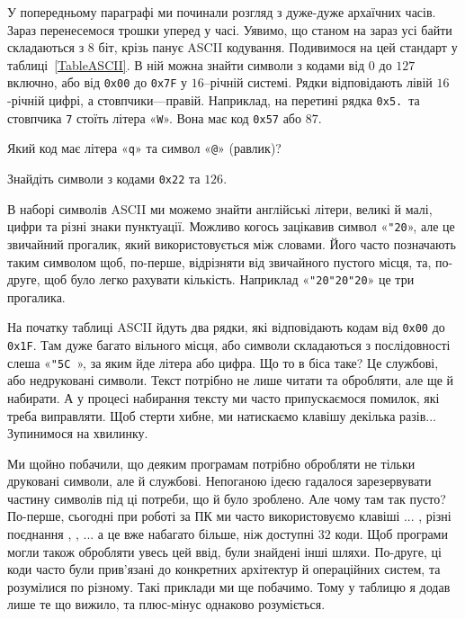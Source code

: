 \documentclass{book}
\newcommand{\hexstr}[1]{{\tt 0x#1}}
\newcommand{\escape}[1]{\texttt{\char"5C #1}}
\newcommand{\chr}[1]{«\texttt{#1}»}
\newcommand{\s}{\char"20}
\newcommand{\chspace}{\chr\s}
\newcommand{\chesc}[1]{\chr{\escape{#1}}}
\begin{document}
У попередньому параграфі ми починали розгляд з дуже-дуже архаїчних часів.
Зараз перенесемося трошки уперед у часі.
Уявимо, що станом на зараз усі байти складаються з $8$ біт, крізь панує ASCII кодування.
Подивимося на цей стандарт у таблиці~\ref{TableASCII}.
В ній можна знайти символи з кодами від $0$ до $127$ включно, або від \hexstr{00} до \hexstr{7F} у $16$--річній системі.
Рядки відповідають лівій $16$-річній цифрі, а стовпчики---правій.
Наприклад, на перетині рядка \hexstr{5.}\ та стовпчика \texttt{7} стоїть літера \chr W.
Вона має код \hexstr{57} або $87$.



\begin{exercise}
Який код має літера \chr q та символ \chr @ (равлик)?
\end{exercise}

\begin{exercise}
Знайдіть символи з кодами \hexstr{22} та $126$.
\end{exercise}

В наборі символів ASCII ми можемо знайти англійські літери, великі й малі, цифри та різні знаки пунктуації.
Можливо когось зацікавив символ \chspace, але це звичайний прогалик, який використовується між словами.
Його часто позначають таким символом щоб, по-перше, відрізняти від звичайного пустого місця, та, по-друге, щоб було легко рахувати кількість.
Наприклад «\texttt{\s\s\s}» це три прогалика.

На початку таблиці ASCII йдуть два рядки, які відповідають кодам від \hexstr{00} до \hexstr{1F}.
Там дуже багато вільного місця, або символи складаються з послідовності слеша \chesc{}, за яким йде літера або цифра.
Що то в біса таке?
Це службові, або недруковані символи.
Текст потрібно не лише читати та обробляти, але ще й набирати.
А у процесі набирання тексту ми часто припускаємося помилок, які треба виправляти.
Щоб стерти хибне,  ми натискаємо клавішу \keys{\backspace} декілька разів...
Зупинимося на хвилинку.

Ми щойно побачили, що деяким програмам потрібно обробляти не тільки друковані символи, але й службові.
Непоганою ідеєю гадалося зарезервувати частину символів під ці потреби, що й було зроблено.
Але чому там так пусто?
По-перше, сьогодні при роботі за ПК ми часто використовуємо клавіші  ... , різні поєднання , , ... а це вже набагато більше, ніж доступні $32$ коди.
Щоб програми могли також обробляти увесь цей ввід, були знайдені інші шляхи.
По-друге, ці коди часто були прив'язані до конкретних архітектур й операційних систем, та розумілися по різному.
Такі приклади ми ще побачимо.
Тому у таблицю я додав лише те що вижило, та плюс-мінус однаково розуміється.
\end{document}

